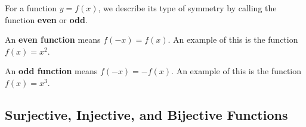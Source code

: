 For a function $y=f(x)$, we describe its type of symmetry by calling the function \textbf{even} or \textbf{odd}.

\begin{defn}
  An \textbf{even function} means $f(-x)=f(x)$. An example of this is the function $f(x)=x^2$.
  \begin{figure}[H]
    \begin{center}
    \end{center}
  \end{figure}
\end{defn}
\begin{defn}
  An \textbf{odd function} means $f(-x)=-f(x)$. An example of this is the function $f(x)=x^3$.
  \begin{figure}[H]
    \begin{center}
    \end{center}
  \end{figure}
\end{defn}
\subsection{Surjective, Injective, and Bijective Functions}

